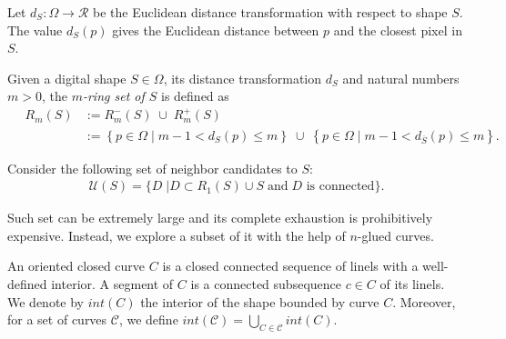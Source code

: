 \documentclass[smallextended]{svjour3}       %
\begin{document}
Let $d_{S}:\Omega \rightarrow \mathcal{R}$ be the Euclidean distance transformation with respect to shape $S$. The value $d_S(p)$ gives the Euclidean distance between $p$ and the closest pixel in $S$. 

\begin{definition}
Given a digital shape $S\in\Omega$, its distance transformation $d_S$ and natural numbers $m > 0$, the {\em $m$-ring set of $S$} is defined as
\begin{align*}
	\quad R_m(S) &:= R_m^-(S) \; \cup \; R_m^+(S) \\
	&:= \left\{ p \in \Omega \; | \; m-1 < d_S(p) \leq m \right\} \; \cup \;  \left\{ p \in \Omega \; | \; 	m-1 < d_{\overline{S}}(p) \leq m \right\}.
\end{align*}
\end{definition}

Consider the following set of neighbor candidates to $S$:
\begin{align*}
\mathcal{U}(S) = \{ D \; | D \subset R_1(S) \cup S \; \text{and} \; \text{$D$ is connected} \}.
\end{align*}


Such set can be extremely large and its complete exhaustion is prohibitively expensive.  Instead, we explore a subset of it with the help of $n$-glued curves.

An oriented closed curve $C$ is a closed connected sequence of linels with a well-defined interior. A segment of $C$ is a connected subsequence $c \in C$ of its linels. We denote by $int(C)$ the interior of the shape bounded by curve $C$. Moreover, for a set of curves $\mathcal{C}$, we define $int(\mathcal{C}) = \bigcup_{C \in \mathcal{C}} int(C) $.
\end{document}
